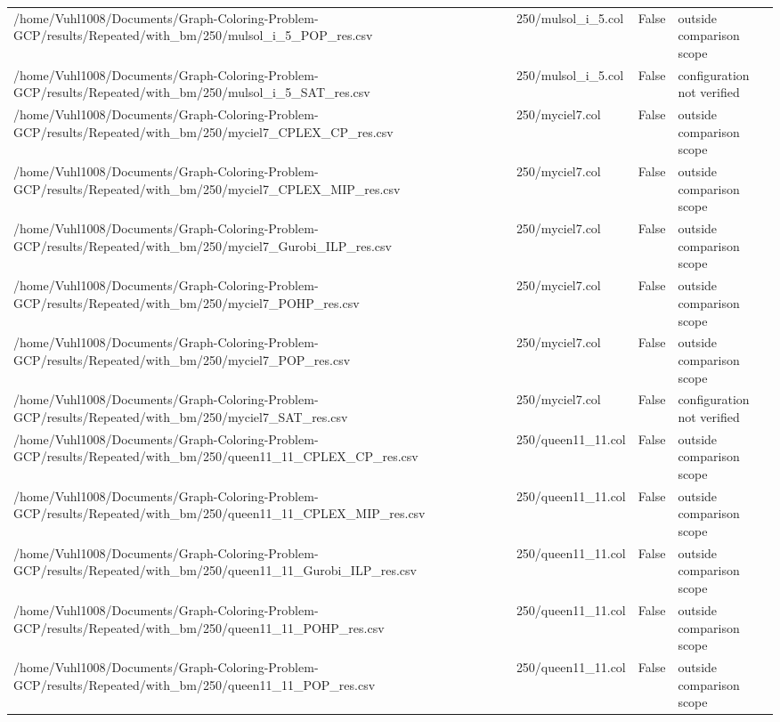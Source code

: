 \begin{table}[htbp]
\begin{tabular}{llll}
/home/Vuhl1008/Documents/Graph-Coloring-Problem-GCP/results/Repeated/with\_bm/250/mulsol\_i\_5\_POP\_res.csv & 250/mulsol\_i\_5.col & False & outside comparison scope \\
/home/Vuhl1008/Documents/Graph-Coloring-Problem-GCP/results/Repeated/with\_bm/250/mulsol\_i\_5\_SAT\_res.csv & 250/mulsol\_i\_5.col & False & configuration not verified \\
/home/Vuhl1008/Documents/Graph-Coloring-Problem-GCP/results/Repeated/with\_bm/250/myciel7\_CPLEX\_CP\_res.csv & 250/myciel7.col & False & outside comparison scope \\
/home/Vuhl1008/Documents/Graph-Coloring-Problem-GCP/results/Repeated/with\_bm/250/myciel7\_CPLEX\_MIP\_res.csv & 250/myciel7.col & False & outside comparison scope \\
/home/Vuhl1008/Documents/Graph-Coloring-Problem-GCP/results/Repeated/with\_bm/250/myciel7\_Gurobi\_ILP\_res.csv & 250/myciel7.col & False & outside comparison scope \\
/home/Vuhl1008/Documents/Graph-Coloring-Problem-GCP/results/Repeated/with\_bm/250/myciel7\_POHP\_res.csv & 250/myciel7.col & False & outside comparison scope \\
/home/Vuhl1008/Documents/Graph-Coloring-Problem-GCP/results/Repeated/with\_bm/250/myciel7\_POP\_res.csv & 250/myciel7.col & False & outside comparison scope \\
/home/Vuhl1008/Documents/Graph-Coloring-Problem-GCP/results/Repeated/with\_bm/250/myciel7\_SAT\_res.csv & 250/myciel7.col & False & configuration not verified \\
/home/Vuhl1008/Documents/Graph-Coloring-Problem-GCP/results/Repeated/with\_bm/250/queen11\_11\_CPLEX\_CP\_res.csv & 250/queen11\_11.col & False & outside comparison scope \\
/home/Vuhl1008/Documents/Graph-Coloring-Problem-GCP/results/Repeated/with\_bm/250/queen11\_11\_CPLEX\_MIP\_res.csv & 250/queen11\_11.col & False & outside comparison scope \\
/home/Vuhl1008/Documents/Graph-Coloring-Problem-GCP/results/Repeated/with\_bm/250/queen11\_11\_Gurobi\_ILP\_res.csv & 250/queen11\_11.col & False & outside comparison scope \\
/home/Vuhl1008/Documents/Graph-Coloring-Problem-GCP/results/Repeated/with\_bm/250/queen11\_11\_POHP\_res.csv & 250/queen11\_11.col & False & outside comparison scope \\
/home/Vuhl1008/Documents/Graph-Coloring-Problem-GCP/results/Repeated/with\_bm/250/queen11\_11\_POP\_res.csv & 250/queen11\_11.col & False & outside comparison scope \\

\end{tabular}
\end{table}
